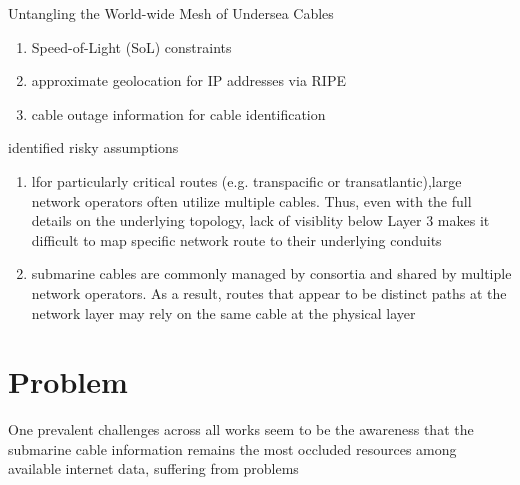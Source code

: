 \documentclass[twocolumn]{article}
\begin{document}
Untangling the World-wide Mesh of Undersea Cables
\begin{enumerate}
    \item Speed-of-Light (SoL) constraints
    \item approximate geolocation for IP addresses via RIPE
    \item cable outage information for cable identification
\end{enumerate}
identified risky assumptions
\begin{enumerate}
    \item lfor particularly critical routes (e.g. transpacific or transatlantic),large network operators often utilize multiple cables. Thus, even with the full details on the underlying topology, lack of visiblity below Layer 3 makes it difficult to map specific network route to their underlying conduits
    \item submarine cables are commonly managed by consortia and shared by multiple network operators. As a result, routes that appear to be distinct paths at the network layer may rely on the same cable at the physical layer
\end{enumerate}
\section{Problem}

One prevalent challenges across all works seem to be the awareness that
the submarine cable information remains the most occluded resources among
available internet data, suffering from problems
\end{document}
